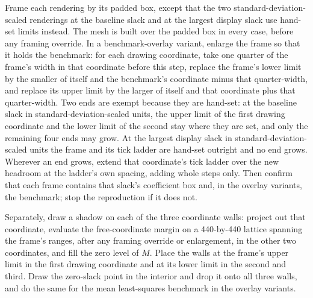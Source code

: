 \documentclass[11pt]{article}
\begin{document}
Frame each rendering by its padded box, except that the two standard-deviation-scaled renderings at
the baseline slack and at the largest display slack use hand-set limits instead. The mesh is built
over the padded box in every case, before any framing override. In a benchmark-overlay variant,
enlarge the frame so that it holds the benchmark: for each drawing coordinate, take one
quarter of the frame's width in that coordinate before this step, replace the frame's lower
limit by the smaller of itself and the benchmark's coordinate minus that quarter-width, and replace
its upper limit by the larger of itself and that coordinate plus that quarter-width. Two ends are exempt because they are hand-set: at
the baseline slack in standard-deviation-scaled units, the upper limit of the first drawing
coordinate and the lower limit of the second stay where they are set, and only the remaining four
ends may grow. At the largest display slack in standard-deviation-scaled units the frame and its
tick ladder are hand-set outright and no end grows. Wherever an end grows, extend that coordinate's
tick ladder over the new headroom at the ladder's own spacing, adding whole steps only. Then confirm
that each frame contains that slack's coefficient box and, in the overlay variants, the benchmark;
stop the reproduction if it does not.

Separately, draw a shadow on each of the three coordinate walls: project out that
coordinate, evaluate the free-coordinate margin on a 440-by-440 lattice spanning the frame's ranges,
after any framing override or enlargement, in the other two coordinates, and fill the zero level of
\(M\). Place the walls at the frame's upper limit in the first drawing coordinate and at its lower
limit in the second and third. Draw the zero-slack point in the
interior and drop it onto all three walls, and do the same for the mean least-squares benchmark in
the overlay variants.
\end{document}
